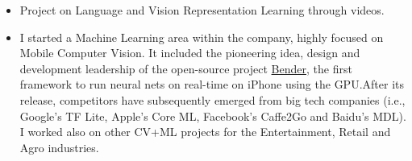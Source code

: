 \documentclass[10pt,a4paper,academicons]{altacv}
\begin{document}
\vspace{3mm}

\nocite{*}

\printbibliography[heading=pubtype,title={\printinfo{\faGroup}{Conference Proceedings}},type=inproceedings]

\pagebreak


\printbibliography[heading=pubtype,title={\printinfo{\faGroup}{Workshop Proceedings}},type=incollection]

\printbibliography[heading=pubtype,title={\printinfo{\faGraduationCap}{Theses}},type=thesis]

\printbibliography[heading=pubtype,title={\printinfo{\faAsterisk}{Non Refereed}},type=misc]



\begin{itemize}
  \item Project on Language and Vision Representation Learning through videos.
\end{itemize}

\divider{}


\begin{itemize}
  \item I started a Machine Learning area within the company, highly focused on Mobile Computer Vision. It included the pioneering idea, design and development leadership of the open-source project {\href{https://github.com/xmartlabs/Bender}{Bender}}, the first framework to run neural nets on real-time on iPhone using the GPU.\@ After its release, competitors have subsequently emerged from big tech companies (i.e., Google’s TF Lite, Apple’s Core ML, Facebook’s Caffe2Go and Baidu’s MDL). I worked also on other CV+ML projects for the Entertainment, Retail and Agro industries.
\end{itemize}

\divider{}


\end{document}
